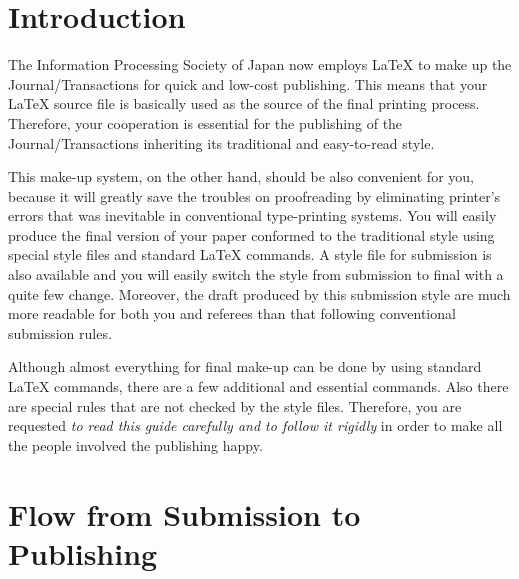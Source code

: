 \maketitle


\section{Introduction}

The Information Processing Society of Japan now employs {\LaTeX} to make up
the Journal\slash Transactions for quick and low-cost publishing.  This
means that your {\LaTeX} source file is basically used as the source of the
final printing process.  Therefore, your cooperation is essential for the
publishing of the Journal\slash Transactions inheriting its traditional and
easy-to-read style.

This make-up system, on the other hand, should be also convenient for you,
because it will greatly save the troubles on proofreading by eliminating
printer's errors that was inevitable in conventional type-printing systems.
You will easily produce the final version of your paper conformed to the
traditional style using special style files and standard {\LaTeX} commands.
A style file for submission is also available and you will easily switch the
style from submission to final with a quite few change.  Moreover, the draft
produced by this submission style are much more readable for both you and
referees than that following conventional submission rules.

Although almost everything for final make-up can be done by using standard
{\LaTeX} commands, there are a few additional and essential commands.  Also
there are special rules that are not checked by the style files.  Therefore,
you are requested {\em to read this guide carefully and to follow it
rigidly} in order to make all the people involved the publishing happy.


\section{Flow from Submission to Publishing}
\label{sec:Enum}\label{sec:enum}

